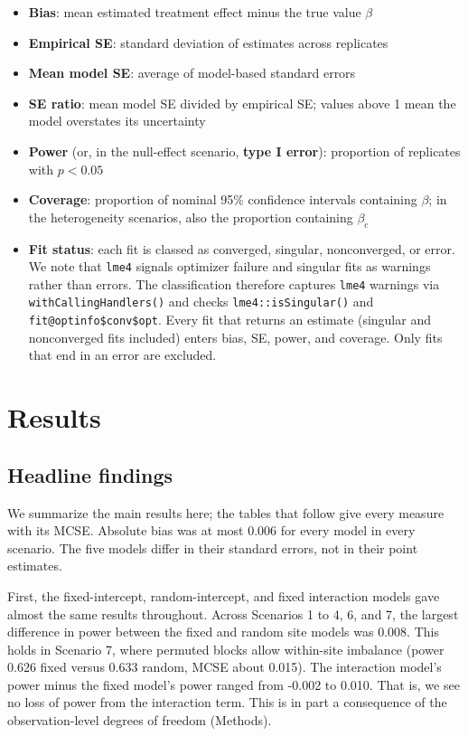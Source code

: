 \documentclass[
  11pt,
]{article}
\providecommand{\tightlist}{%
  \setlength{\itemsep}{0pt}\setlength{\parskip}{0pt}}
\begin{document}
\begin{itemize}
\tightlist
\item
  \textbf{Bias}: mean estimated treatment effect minus the true value
  \(\beta\)
\item
  \textbf{Empirical SE}: standard deviation of estimates across
  replicates
\item
  \textbf{Mean model SE}: average of model-based standard errors
\item
  \textbf{SE ratio}: mean model SE divided by empirical SE; values
  above 1 mean the model overstates its uncertainty
\item
  \textbf{Power} (or, in the null-effect scenario, \textbf{type I error}):
  proportion of replicates with \(p < 0.05\)
\item
  \textbf{Coverage}: proportion of nominal 95\% confidence intervals
  containing \(\beta\); in the heterogeneity scenarios, also the
  proportion containing \(\beta_{\mathrm{c}}\)
\item
  \textbf{Fit status}: each fit is classed as converged, singular,
  nonconverged, or error. We note that \texttt{lme4} signals optimizer
  failure and singular fits as warnings rather than errors. The
  classification therefore captures \texttt{lme4} warnings via
  \texttt{withCallingHandlers()} and checks \texttt{lme4::isSingular()} and
  \texttt{fit@optinfo\$conv\$opt}. Every fit that returns an estimate
  (singular and nonconverged fits included) enters bias, SE, power,
  and coverage. Only fits that end in an error are excluded.
\end{itemize}

\section{Results}\label{results}

\subsection{Headline findings}\label{headline-findings}

We summarize the main results here; the tables that follow give
every measure with its MCSE. Absolute bias was at most
0.006 for every model in every scenario. The five models
differ in their standard errors, not in their point estimates.

First, the fixed-intercept, random-intercept, and fixed interaction
models gave almost the same results throughout. Across Scenarios 1
to 4, 6, and 7, the largest difference in power between the fixed
and random site models was 0.008. This holds in
Scenario 7, where permuted blocks allow within-site imbalance (power
0.626 fixed versus
0.633 random, MCSE about
0.015).
The interaction model's power minus the fixed model's power ranged
from -0.002 to 0.010.
That is, we see no loss of power from the interaction term. This is
in part a consequence of the observation-level degrees of freedom
(Methods).
\end{document}

